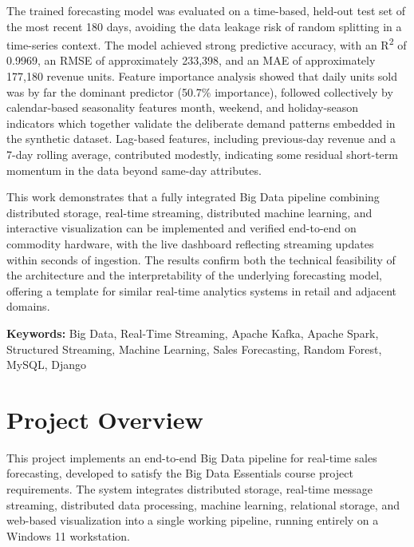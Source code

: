 \documentclass[11pt]{article}
\begin{document}
\vspace{0.3cm}
\noindent
The trained forecasting model was evaluated on a time-based, held-out test set of the most recent 180 days, avoiding the data leakage risk of random splitting in a time-series context. The model achieved strong predictive accuracy, with an R\textsuperscript{2} of 0.9969, an RMSE of approximately 233{,}398, and an MAE of approximately 177{,}180 revenue units. Feature importance analysis showed that daily units sold was by far the dominant predictor (50.7\% importance), followed collectively by calendar-based seasonality features month, weekend, and holiday-season indicators which together validate the deliberate demand patterns embedded in the synthetic dataset. Lag-based features, including previous-day revenue and a 7-day rolling average, contributed modestly, indicating some residual short-term momentum in the data beyond same-day attributes.

\vspace{0.3cm}
\noindent
This work demonstrates that a fully integrated Big Data pipeline combining distributed storage, real-time streaming, distributed machine learning, and interactive visualization can be implemented and verified end-to-end on commodity hardware, with the live dashboard reflecting streaming updates within seconds of ingestion. The results confirm both the technical feasibility of the architecture and the interpretability of the underlying forecasting model, offering a template for similar real-time analytics systems in retail and adjacent domains.

\vspace{0.5cm}
\noindent
\textbf{\color{navy}Keywords:} Big Data, Real-Time Streaming, Apache Kafka, Apache Spark, Structured Streaming, Machine Learning, Sales Forecasting, Random Forest, MySQL, Django

\newpage
\section{Project Overview}

This project implements an end-to-end Big Data pipeline for real-time sales forecasting, developed to satisfy the Big Data Essentials course project requirements. The system integrates distributed storage, real-time message streaming, distributed data processing, machine learning, relational storage, and web-based visualization into a single working pipeline, running entirely on a Windows 11 workstation.
\end{document}
